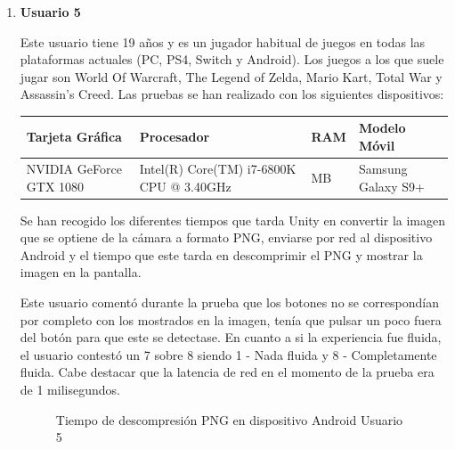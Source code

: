 \begin{enumerate}

\item \textbf{Usuario 5}

Este usuario tiene 19 a\~nos y es un jugador habitual de juegos en todas las plataformas actuales (PC, PS4, Switch y Android). Los juegos a los que suele jugar son World Of Warcraft, The Legend of Zelda, Mario Kart, Total War y Assassin's Creed.
Las pruebas se han realizado con los siguientes dispositivos: \\

\begin{tabularx}{1.0\textwidth} { 
  | >{\centering\arraybackslash}X 
  | >{\centering\arraybackslash}X 
  | >{\centering\arraybackslash}X 
  | >{\centering\arraybackslash}X | }
 \hline
 \textbf{Tarjeta Gr\'afica} & \textbf{Procesador} & \textbf{RAM} & \textbf{Modelo M\'ovil} \\
 \hline
NVIDIA GeForce GTX 1080  & Intel(R) Core(TM) i7-6800K CPU @ 3.40GHz  & 32668 MB & Samsung Galaxy S9+  \\
\hline
\end{tabularx}


Se han recogido los diferentes tiempos que tarda Unity en convertir la imagen que se optiene de la c\'amara a formato PNG, enviarse por red al dispositivo Android y el tiempo que este tarda en descomprimir el PNG y mostrar la imagen en la pantalla. 

Este usuario coment\'o durante la prueba que los botones no se correspond\'ian por completo con los mostrados en la imagen, ten\'ia que pulsar un poco fuera del bot\'on para que este se detectase. En cuanto a si la experiencia fue fluida, el usuario contest\'o un 7 sobre 8 siendo 1 - Nada fluida y 8 - Completamente fluida. Cabe destacar que la latencia de red en el momento de la prueba era de 1 milisegundos.

\begin{figure}[!h]
\centering
{}%
\caption{Tiempo de descompresi\'on PNG en dispositivo Android Usuario 5}
\end{figure}


\end{enumerate}
